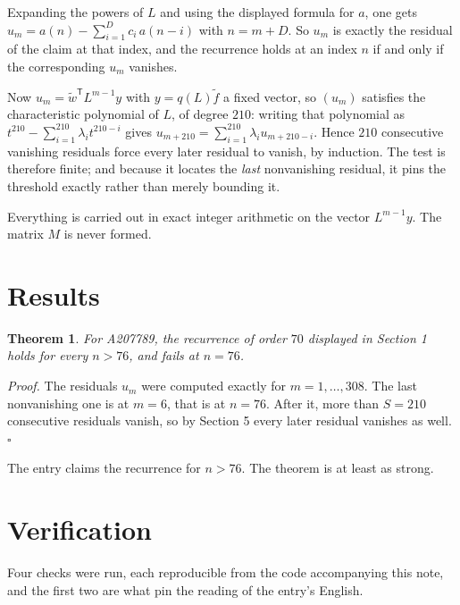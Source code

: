 \documentclass[11pt]{article}
\newtheorem{theorem}{Theorem}
\theoremstyle{definition}
\begin{document}
Expanding the powers of $L$ and using the displayed formula for $a$, one gets $u_m = a(n) - \sum_{i=1}^{D} c_i\,a(n-i)$ with $n = m + D$. So $u_m$ is exactly the residual of the claim at that index, and the recurrence holds at an index $n$ if and only if the corresponding $u_m$ vanishes.

Now $u_m = \tilde w^{\mathsf T} L^{m-1} y$ with $y = q(L)\tilde f$ a fixed vector, so $(u_m)$ satisfies the characteristic polynomial of $L$, of degree $210$: writing that polynomial as $t^{210} - \sum_{i=1}^{210} \lambda_i t^{210-i}$ gives $u_{m+210} = \sum_{i=1}^{210} \lambda_i u_{m+210-i}$. Hence $210$ consecutive vanishing residuals force every later residual to vanish, by induction. The test is therefore finite; and because it locates the {\itshape last} nonvanishing residual, it pins the threshold exactly rather than merely bounding it.

Everything is carried out in exact integer arithmetic on the vector $L^{m-1}y$. The matrix $M$ is never formed.

\section{Results}

\begin{theorem} For A207789, the recurrence of order $70$ displayed in Section 1 holds for every $n > 76$, and fails at $n = 76$.\end{theorem}

{\itshape Proof.} The residuals $u_m$ were computed exactly for $m = 1,\dots,308$. The last nonvanishing one is at $m = 6$, that is at $n = 76$. After it, more than $S = 210$ consecutive residuals vanish, so by Section 5 every later residual vanishes as well. $\square$

The entry claims the recurrence for $n > 76$. The theorem is at least as strong.

\section{Verification}

Four checks were run, each reproducible from the code accompanying this note, and the first two are what pin the reading of the entry's English.
\end{document}
